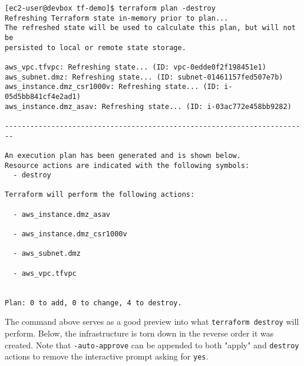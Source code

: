 \begin{verbatim}
[ec2-user@devbox tf-demo]$ terraform plan -destroy
Refreshing Terraform state in-memory prior to plan...
The refreshed state will be used to calculate this plan, but will not be
persisted to local or remote state storage.

aws_vpc.tfvpc: Refreshing state... (ID: vpc-0edde0f2f198451e1)
aws_subnet.dmz: Refreshing state... (ID: subnet-01461157fed507e7b)
aws_instance.dmz_csr1000v: Refreshing state... (ID: i-05d5bb841cf4e2ad1)
aws_instance.dmz_asav: Refreshing state... (ID: i-03ac772e458bb9282)

------------------------------------------------------------------------

An execution plan has been generated and is shown below.
Resource actions are indicated with the following symbols:
  - destroy

Terraform will perform the following actions:

  - aws_instance.dmz_asav

  - aws_instance.dmz_csr1000v

  - aws_subnet.dmz

  - aws_vpc.tfvpc


Plan: 0 to add, 0 to change, 4 to destroy.
\end{verbatim}

The command above serves as a good preview into what \verb|terraform destroy| will
perform. Below, the infrastructure is torn down in the reverse order it was
created. Note that \verb|-auto-approve| can be appended to both "apply" and
\verb|destroy| actions to remove the interactive prompt asking for \verb|yes|.

